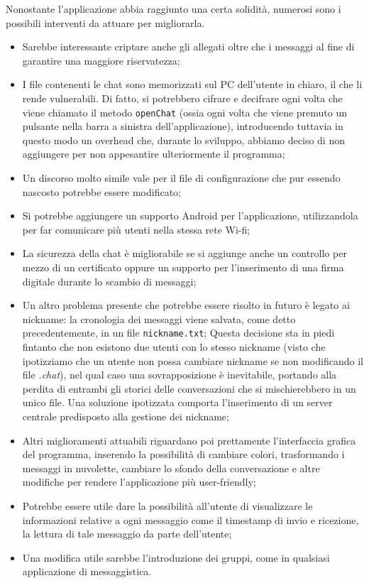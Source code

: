 Nonostante l'applicazione abbia raggiunto una certa solidità,
numerosi sono i possibili interventi da attuare per migliorarla.
\begin{itemize}
	\item Sarebbe interessante criptare anche gli allegati oltre che i
	messaggi al fine di garantire una maggiore riservatezza;
	\item I file contenenti le chat sono memorizzati sul PC
	dell'utente in chiaro, il che li rende vulnerabili.
	Di fatto, si potrebbero cifrare e decifrare ogni volta che 	
	viene chiamato il metodo \texttt{openChat} (ossia ogni volta che viene premuto un pulsante nella barra a 
	sinistra dell'applicazione), introducendo tuttavia in questo modo un overhead che,
	durante lo sviluppo, abbiamo
	deciso di non aggiungere per non appesantire ulteriormente il programma;
	\item Un discorso molto simile vale per il file di configurazione che pur 
	essendo nascosto potrebbe essere	modificato;
	\item Si potrebbe aggiungere un supporto Android per l'applicazione, utilizzandola
	per far comunicare più utenti nella stessa rete Wi-fi;
	\item La sicurezza della chat è migliorabile se si aggiunge anche un controllo
	per mezzo di un certificato oppure un supporto per l'inserimento di una firma
	digitale durante lo scambio di messaggi;
	\item Un altro problema presente che potrebbe essere risolto in futuro è legato ai nickname:
	la cronologia dei messaggi viene salvata, come detto precedentemente, in un file 
	\texttt{nickname.txt};
	Questa decisione sta in piedi fintanto che non esistono due utenti con lo stesso nickname
	(visto che ipotizziamo che un utente non  possa cambiare nickname se non modificando il file
	\emph{.chat}), nel qual caso una sovrapposizione è 
	inevitabile, portando alla perdita di entrambi gli storici delle conversazioni
	che si mischierebbero in un unico file.
	Una soluzione ipotizzata comporta l'inserimento di un server centrale predisposto alla gestione dei 
	nickname;
	\item Altri miglioramenti attuabili riguardano poi prettamente l'interfaccia grafica
	del programma, inserendo la 
	possibilità di cambiare colori, trasformando i messaggi in nuvolette, cambiare
	lo sfondo della conversazione e 
	altre modifiche per rendere l'applicazione più user-friendly;
	\item Potrebbe essere utile dare la possibilità all'utente di visualizzare le informazioni relative a ogni 
	messaggio come il timestamp di invio e ricezione, la lettura di tale messaggio da parte dell'utente;
	\item Una modifica utile sarebbe l'introduzione dei gruppi, 
	come in qualsiasi applicazione di messaggistica.
\end{itemize}